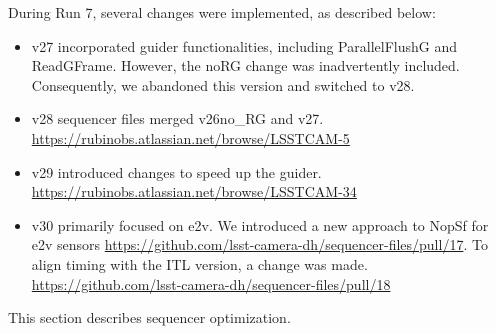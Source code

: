 During Run 7, several changes were implemented, as described below:

\begin{itemize}
\tightlist
\item
  v27 incorporated guider functionalities, including ParallelFlushG and
  ReadGFrame. However, the noRG change was inadvertently included.
  Consequently, we abandoned this version and switched to v28.
\item
  v28 sequencer files merged v26\label{no_rg}{no\_RG} and
  v27. \url{https://rubinobs.atlassian.net/browse/LSSTCAM-5}
\item
  v29 introduced changes to speed up the guider.
  \url{https://rubinobs.atlassian.net/browse/LSSTCAM-34}
\item
  v30 primarily focused on e2v. We introduced a new approach to NopSf
  for e2v sensors
  \url{https://github.com/lsst-camera-dh/sequencer-files/pull/17}. To
  align timing with the ITL version, a change was made.
  \url{https://github.com/lsst-camera-dh/sequencer-files/pull/18}
\end{itemize}

This section describes sequencer optimization.

